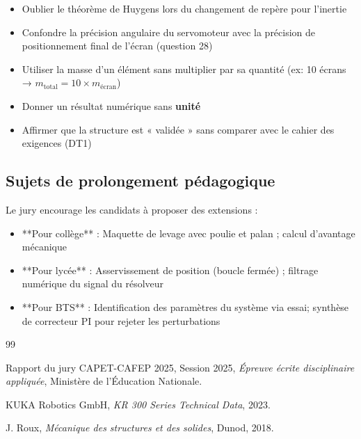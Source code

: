 \documentclass[12pt,a4paper,twoside]{article}
\begin{document}
\begin{itemize}
  \item Oublier le théorème de Huygens lors du changement de repère pour l'inertie
  \item Confondre la précision angulaire du servomoteur avec la précision de positionnement final de l'écran (question 28)
  \item Utiliser la masse d'un élément sans multiplier par sa quantité (ex: 10 écrans → $m_{\text{total}} = 10 \times m_{\text{écran}}$)
  \item Donner un résultat numérique sans \textbf{unité}
  \item Affirmer que la structure est « validée » sans comparer avec le cahier des exigences (DT1)
\end{itemize}

\subsection*{Sujets de prolongement pédagogique}

Le jury encourage les candidats à proposer des extensions :

\begin{itemize}
  \item **Pour collège** : Maquette de levage avec poulie et palan ; calcul d'avantage mécanique
  \item **Pour lycée** : Asservissement de position (boucle fermée) ; filtrage numérique du signal du résolveur
  \item **Pour BTS** : Identification des paramètres du système via essai; synthèse de correcteur PI pour rejeter les perturbations
\end{itemize}

\begin{thebibliography}{99}

 Rapport du jury CAPET-CAFEP 2025, Session 2025, \textit{Épreuve écrite disciplinaire appliquée}, Ministère de l'Éducation Nationale.

 KUKA Robotics GmbH, \textit{KR 300 Series Technical Data}, 2023.

 J. Roux, \textit{Mécanique des structures et des solides}, Dunod, 2018.

\end{thebibliography}
\end{document}
